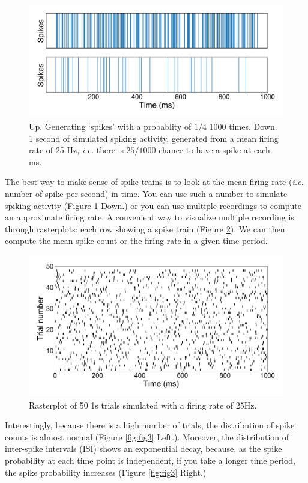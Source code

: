 \documentclass{article}
\begin{document}
\begin{figure}[H]
\centering
\includegraphics[width=.8\linewidth]{report3_fig14.png}
\caption[spt]{Up. Generating `spikes' with a probablity of $1/4$ 1000 times. Down. 1 second of simulated spiking activity, generated from a mean firing rate of 25 Hz, \textit{i.e.} there is $25/1000$ chance to have a spike at each ms.}\label{fig:fig1}
\end{figure}

The best way to make sense of spike trains is to look at the mean firing rate (\textit{i.e.} number of spike per second) in time. You can use such a number to simulate spiking activity (Figure \ref{fig:fig1} Down.) or you can use multiple recordings to compute an approximate firing rate. A convenient way to visualize multiple recording is through rasterplots: each row showing a spike train (Figure \ref{fig:fig2}). We can then compute the mean spike count or the firing rate in a given time period.

\begin{figure}[H]
\centering
\includegraphics[width=.8\linewidth]{report3_fig3.png}
\caption[spt]{Rasterplot of 50 1s trials simulated with a firing rate of 25Hz.}\label{fig:fig2}
\end{figure}

Interestingly, because there is a high number of trials, the distribution of spike counts is almost normal (Figure \ref{fig:fig3} Left.). Moreover, the distribution of inter-spike intervals (ISI) shows an exponential decay, because, as the spike probability at each time point is independent, if you take a longer time period, the spike probability increases (Figure \ref{fig:fig3} Right.)
\end{document}
